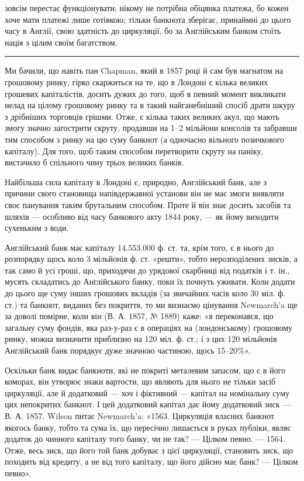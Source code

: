 \parcont{}  %
зовсім перестає функціонувати; нікому не потрібна обіцянка платежа, бо кожен
хоче мати платежі лише готівкою; тільки банкнота зберігає, принаймні до цього
часу в Англії, свою здатність до циркуляції, бо за Англійським банком стоїть
нація з цілим своїм багатством.

\pfbreak

Ми бачили, що навіть пан Chapman, який в 1857 році й сам був магнатом
на грошовому ринку, гірко скаржиться на те, що в Лондоні є кілька великих
грошевих капіталістів, досить дужих до того, щоб в певний момент викликати
нелад на цілому грошовому ринку та в такий найганебніший спосіб драти шкуру
з дрібніших торговців грішми. Отже, є кілька таких великих акул, що мають
змогу значно загострити скруту, продавши на 1--2 мільйони консолів та забравши
тим способом з ринку на цю суму банкнот (а одночасно вільного позичкового
капіталу). Для того, щоб таким способом перетворити скруту на паніку,
вистачило б спільного чину трьох великих банків.

Найбільша сила капіталу в Лондоні є, природно, Англійський банк, але
з причини свого становища напівдержавної установи він не має змоги виявляти
своє панування таким брутальним способом. Проте й він знає досить засобів
та шляхів — особливо від часу банкового акту 1844 року, — як йому виходити
сухеньким з води.

Англійський банк має капіталу 14.553.000 ф. ст. та, крім того, є в нього
до розпорядку щось коло 3 мільйонів ф. ст. «решти», тобто нерозподілених зисків,
а так само й усі гроші, що, приходячи до урядової скарбниці від податків
і т. ін., мусять складатись до Англійського банку, поки їх почнуть уживати.
Коли додати до цього ще суму інших грошових вкладів (за звичайних часів
коло 30 міл. ф. ст.) та банкнот, виданих без покриття, то ми визнаємо цінування
Newmarch’a ще за доволі помірне, коли він (В. А. 1857, № 1889)
каже: «я переконався, що загальну суму фондів, яка раз-у-раз є в операціях
на (лондонському) грошовому ринку, можна визначити приблизно на 120 міл.
ф. ст.; і з цих 120 мільйонів Англійський банк порядкує дуже значною частиною,
щось 15--20\%».

Оскільки банк видає банкноти, які не покриті металевим запасом, що є в його
коморах, він утворює знаки вартости, що являють для нього не тільки засіб циркуляції,
але й додатковий — хоч і фіктивний — капітал на номінальну суму цих непокритих
банкнот. І цей додатковий капітал дає йому додатковий зиск — В. А. 1857.
Wilson питає Newmarch’a: «1563. Циркуляція власних банкнот якогось банку,
тобто та сума їх, що пересічно лишається в руках публіки, являє додаток до
чинного капіталу того банку, чи не так? — Цілком певно. — 1564. Отже, весь
зиск, що його той банк добуває з цієї циркуляції, становить зиск, що походить
від кредиту, а не від того капіталу, що його дійсно має банк? — Цілком певно».

